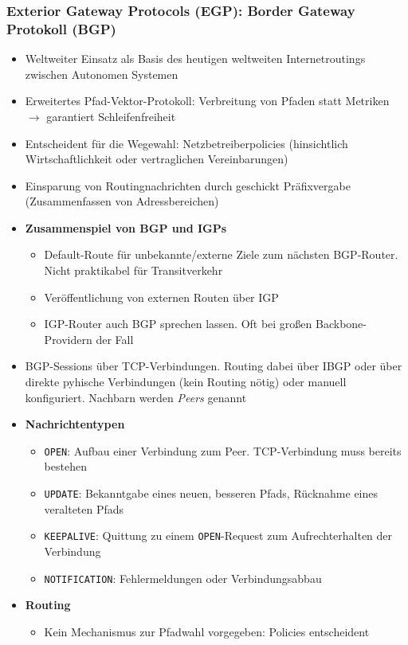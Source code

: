 \subsubsection{Exterior Gateway Protocols (EGP): Border Gateway Protokoll (BGP)}
\begin{itemize}
	\item Weltweiter Einsatz als Basis des heutigen weltweiten Internetroutings zwischen Autonomen Systemen
	\item Erweitertes Pfad-Vektor-Protokoll: Verbreitung von Pfaden statt Metriken \(\rightarrow\) garantiert Schleifenfreiheit
	\item Entscheident für die Wegewahl: Netzbetreiberpolicies (hinsichtlich Wirtschaftlichkeit oder vertraglichen Vereinbarungen)
	\item Einsparung von Routingnachrichten durch geschickt Präfixvergabe (Zusammenfassen von Adressbereichen)
	\item \textbf{Zusammenspiel von BGP und IGPs}
	\begin{itemize}
		\item Default-Route für unbekannte/externe Ziele zum nächsten BGP-Router. Nicht praktikabel für Transitverkehr
		\item Veröffentlichung von externen Routen über IGP
		\item IGP-Router auch BGP sprechen lassen. Oft bei großen Backbone-Providern der Fall
	\end{itemize}
	\item BGP-Sessions über TCP-Verbindungen. Routing dabei über IBGP oder über direkte pyhische Verbindungen (kein Routing nötig) oder manuell konfiguriert. Nachbarn werden \textit{Peers} genannt
	\item \textbf{Nachrichtentypen}
	\begin{itemize}
		\item \texttt{OPEN}: Aufbau einer Verbindung zum Peer. TCP-Verbindung muss bereits bestehen
		\item \texttt{UPDATE}: Bekanntgabe eines neuen, besseren Pfads, Rücknahme eines veralteten Pfads
		\item \texttt{KEEPALIVE}: Quittung zu einem \texttt{OPEN}-Request zum Aufrechterhalten der Verbindung
		\item \texttt{NOTIFICATION}: Fehlermeldungen oder Verbindungsabbau
	\end{itemize}
	\item \textbf{Routing}
	\begin{itemize}
		\item Kein Mechanismus zur Pfadwahl vorgegeben: Policies entscheident

\end{itemize}
\end{itemize}
